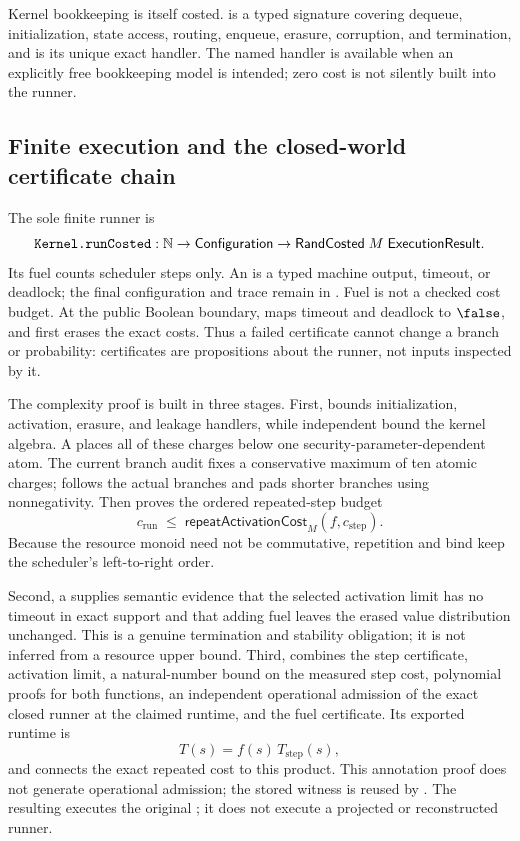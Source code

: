 Kernel bookkeeping is itself costed.   is a typed
signature covering dequeue, initialization, state access, routing, enqueue,
erasure, corruption, and termination, and  is its unique
exact handler.  The named  handler is available when
an explicitly free bookkeeping model is intended; zero cost is not silently
built into the runner.

\subsection{Finite execution and the closed-world certificate chain}

The sole finite runner is
\[
  \decl{Kernel.runCosted} :
  \Nat \to \mathsf{Configuration} \to
  \mathsf{RandCosted}\;M\;\mathsf{ExecutionResult}.
\]
Its fuel counts scheduler steps only.  An  is a typed
machine output, timeout, or deadlock; the final configuration and trace remain
in .  Fuel is not a checked cost budget.  At the public
Boolean boundary,  maps timeout and deadlock to
$\false$, and  first erases the exact costs.  Thus a
failed certificate cannot change a branch or probability: certificates are
propositions about the runner, not inputs inspected by it.

The complexity proof is built in three stages.  First,
 bounds initialization, activation, erasure,
and leakage handlers, while independent  bound the
kernel algebra.  A  places all of these charges below
one security-parameter-dependent atom.  The current branch audit fixes a
conservative maximum of ten atomic charges;  follows the
actual  branches and pads shorter branches using nonnegativity.
Then  proves the ordered repeated-step budget
\[
  c_{\mathrm{run}} \;\leq\;
  \mathsf{repeatActivationCost}_M(f,c_{\mathrm{step}}).
\]
Because the resource monoid need not be commutative, repetition and bind keep
the scheduler's left-to-right order.

Second, a  supplies semantic evidence that the selected
activation limit has no timeout in exact support and that adding fuel leaves
the erased value distribution unchanged.  This is a genuine termination and
stability obligation; it is not inferred from a resource upper bound.  Third,
 combines the step certificate, activation
limit, a natural-number bound on the measured step cost, polynomial proofs for
both functions, an independent operational admission of the exact closed
runner at the claimed runtime, and the fuel certificate.  Its exported runtime is
\[
  T(s)=f(s)\,T_{\mathrm{step}}(s),
\]
and  connects the exact repeated cost to this
product.  This annotation proof does not generate operational admission; the
stored witness is reused by .  The resulting
 executes the original
; it does not execute a projected or reconstructed
runner.

